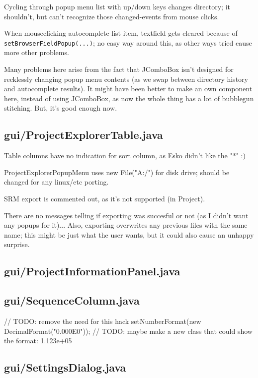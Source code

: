 Cycling through popup menu list with up/down keys changes directory; it shouldn't, but can't recognize those changed-events from mouse clicks.

When mouseclicking autocomplete list item, textfield gets cleared because of \texttt{setBrowserFieldPopup(...)}; no easy way around this, as other ways tried cause more other problems.

Many problems here arise from the fact that JComboBox isn't designed for recklessly changing popup menu contents (as we swap between directory history and autocomplete results). It might have been better to make an own component here, instead of using JComboBox, as now the whole thing has a lot of bubblegun stitching. But, it's good enough now.


\subsection{gui/ProjectExplorerTable.java}

Table columns have no indication for sort column, as Esko didn't like the "*" :)
	    
ProjectExplorerPopupMenu uses new File("A:/") for disk drive; should be changed for any linux/etc porting.

SRM export is commented out, as it's not supported (in Project).

There are no messages telling if exporting was succesful or not (as I didn't want any popups for it)... Also, exporting overwrites any previous files with the same name; this might be just what the user wants, but it could also cause an unhappy surprise.


\subsection{gui/ProjectInformationPanel.java}

\subsection{gui/SequenceColumn.java}
        // TODO: remove the need for this hack
            setNumberFormat(new DecimalFormat("0.000E0"));  // TODO: maybe make a new class that could show the format: 1.123e+05

\subsection{gui/SettingsDialog.java}

